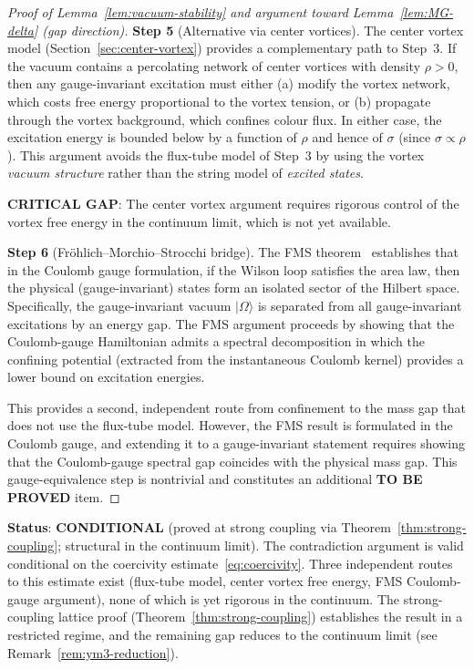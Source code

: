 \documentclass[11pt]{article}
\begin{document}
\begin{proof}[Proof of Lemma~\ref{lem:vacuum-stability}
and argument toward Lemma~\ref{lem:MG-delta} (gap direction)]
\textbf{Step 5} (Alternative via center vortices).  The center vortex
model (Section~\ref{sec:center-vortex}) provides a complementary path to
Step~3.  If the vacuum contains a percolating network of center vortices
with density $\rho > 0$, then any gauge-invariant excitation must either
(a) modify the vortex network, which costs free energy proportional to the
vortex tension, or (b) propagate through the vortex background, which
confines colour flux.  In either case, the excitation energy is bounded
below by a function of $\rho$ and hence of $\sigma$ (since
$\sigma \propto \rho$).  This argument avoids the flux-tube model of Step~3
by using the vortex \emph{vacuum structure} rather than the string model
of \emph{excited states}.

\textbf{CRITICAL GAP}: The center vortex argument requires rigorous control
of the vortex free energy in the continuum limit, which is not yet available.

\textbf{Step 6} (Fr\"ohlich--Morchio--Strocchi bridge).  The FMS
theorem~\cite{FMS} establishes that in the Coulomb gauge formulation,
if the Wilson loop satisfies the area law, then the physical
(gauge-invariant) states form an isolated sector of the Hilbert space.
Specifically, the gauge-invariant vacuum $|\Omega\rangle$ is separated
from all gauge-invariant excitations by an energy gap.  The FMS argument
proceeds by showing that the Coulomb-gauge Hamiltonian admits a spectral
decomposition in which the confining potential (extracted from the
instantaneous Coulomb kernel) provides a lower bound on excitation
energies.

This provides a second, independent route from confinement to the mass
gap that does not use the flux-tube model.  However, the FMS result is
formulated in the Coulomb gauge, and extending it to a gauge-invariant
statement requires showing that the Coulomb-gauge spectral gap coincides
with the physical mass gap.  This gauge-equivalence step is nontrivial
and constitutes an additional \textbf{TO BE PROVED} item.
\end{proof}

\textbf{Status}: \textbf{CONDITIONAL} (proved at strong coupling via
Theorem~\ref{thm:strong-coupling}; structural in the continuum limit).
The contradiction argument is valid conditional on the coercivity
estimate~\eqref{eq:coercivity}.  Three independent routes to this
estimate exist (flux-tube model, center vortex free energy,
FMS Coulomb-gauge argument), none of which is yet rigorous in the
continuum.  The strong-coupling lattice proof
(Theorem~\ref{thm:strong-coupling}) establishes the result in a
restricted regime, and the remaining gap reduces to the continuum limit
(see Remark~\ref{rem:ym3-reduction}).
\end{document}
